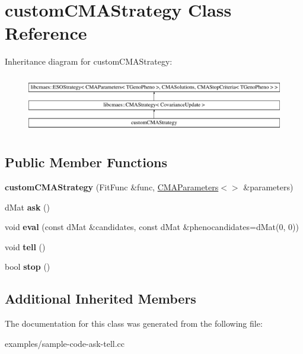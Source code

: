 \hypertarget{classcustomCMAStrategy}{\section{custom\+C\+M\+A\+Strategy Class Reference}
\label{classcustomCMAStrategy}
}
Inheritance diagram for custom\+C\+M\+A\+Strategy\+:\begin{figure}[H]
\begin{center}
\leavevmode
\includegraphics[height=2.572741cm]{classcustomCMAStrategy}
\end{center}
\end{figure}
\subsection*{Public Member Functions}
\begin{DoxyCompactItemize}
\item 
\hypertarget{classcustomCMAStrategy_a8d471b2aaca71aef766ce1030b20ae58}{{\bfseries custom\+C\+M\+A\+Strategy} (Fit\+Func \&func, \hyperlink{classlibcmaes_1_1CMAParameters}{C\+M\+A\+Parameters}$<$$>$ \&parameters)}\label{classcustomCMAStrategy_a8d471b2aaca71aef766ce1030b20ae58}

\item 
\hypertarget{classcustomCMAStrategy_a1c611a946b6252688edfc680ad2745c6}{d\+Mat {\bfseries ask} ()}\label{classcustomCMAStrategy_a1c611a946b6252688edfc680ad2745c6}

\item 
\hypertarget{classcustomCMAStrategy_ad88a47f2d2d7c01ad7196442181c61c3}{void {\bfseries eval} (const d\+Mat \&candidates, const d\+Mat \&phenocandidates=d\+Mat(0, 0))}\label{classcustomCMAStrategy_ad88a47f2d2d7c01ad7196442181c61c3}

\item 
\hypertarget{classcustomCMAStrategy_a45d116c8f308da33df7de95d8b0fc9a7}{void {\bfseries tell} ()}\label{classcustomCMAStrategy_a45d116c8f308da33df7de95d8b0fc9a7}

\item 
\hypertarget{classcustomCMAStrategy_ad600466db80f4a4692f66477529a457f}{bool {\bfseries stop} ()}\label{classcustomCMAStrategy_ad600466db80f4a4692f66477529a457f}

\end{DoxyCompactItemize}
\subsection*{Additional Inherited Members}


The documentation for this class was generated from the following file\+:\begin{DoxyCompactItemize}
\item 
examples/sample-\/code-\/ask-\/tell.\+cc\end{DoxyCompactItemize}
